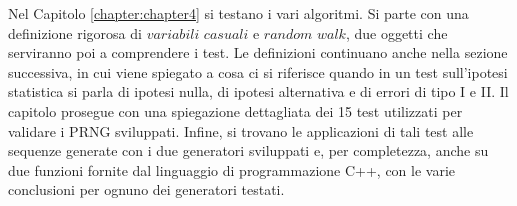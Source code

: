 Nel Capitolo \ref{chapter:chapter4} si testano i vari algoritmi.
Si parte con una definizione rigorosa di $\textit{variabili casuali}$ e $\textit{random walk}$, due oggetti che serviranno poi a comprendere i test.
Le definizioni continuano anche nella sezione successiva, in cui viene spiegato a cosa ci si riferisce quando in un test sull'ipotesi statistica si parla di ipotesi nulla, di ipotesi alternativa e di errori di tipo I e II.
Il capitolo prosegue con una spiegazione dettagliata dei 15 test utilizzati per validare i PRNG sviluppati.
Infine, si trovano le applicazioni di tali test alle sequenze generate con i due generatori sviluppati e, per completezza, anche su due funzioni fornite dal linguaggio di programmazione C++, con le varie conclusioni per ognuno dei generatori testati.
